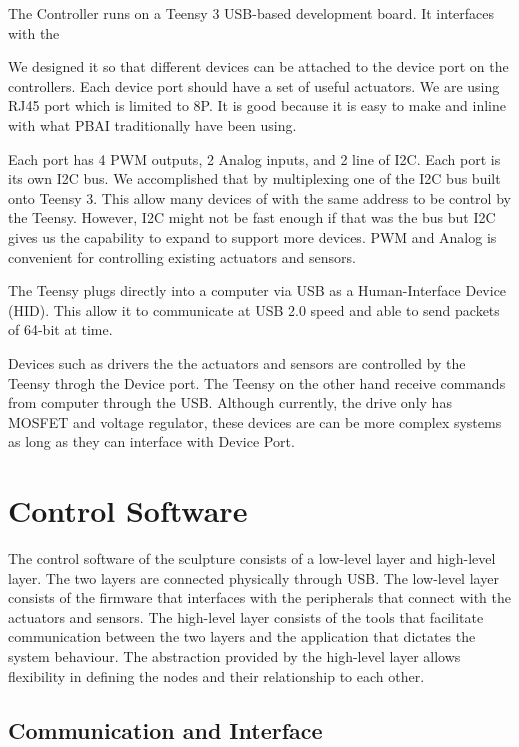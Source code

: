 The Controller runs on a Teensy 3 USB-based development board. It interfaces with the 

We designed it so that different devices can be attached to the device port on the controllers. Each device port should have a set of useful actuators. We are using RJ45 port which is limited to 8P. It is good because it is easy to make and inline with what PBAI traditionally have been using.

Each port has 4 PWM outputs, 2 Analog inputs, and 2 line of I2C. Each port is its own I2C bus. We accomplished that by multiplexing one of the I2C bus built onto Teensy 3. This allow many devices of with the same address to be control by the Teensy. However, I2C might not be fast enough if that was the bus but I2C gives us the capability to expand to support more devices. 
PWM and Analog is convenient for controlling existing actuators and sensors.

The Teensy plugs directly into a computer via USB as a Human-Interface Device (HID). This allow it to communicate at USB 2.0 speed and able to send packets of 64-bit at time. 

Devices such as drivers the the actuators and sensors are controlled by the Teensy throgh the Device port. The Teensy on the other hand receive commands from computer through the USB. 
Although currently, the drive only has MOSFET and voltage regulator, these devices are can be more complex systems as long as they can interface with Device Port. 


\section{Control Software}

The control software of the sculpture consists of a low-level layer and high-level layer. The two layers are connected physically through USB. The low-level layer consists of the firmware that interfaces with the peripherals that connect with the actuators and sensors. The high-level layer consists of the tools that facilitate communication between the two layers and the application that dictates the system behaviour. The abstraction provided by the high-level layer allows flexibility in defining the nodes and their relationship to each other. 

\subsection{Communication and Interface}

